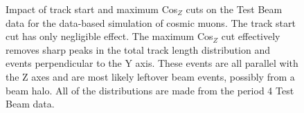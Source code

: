 \documentclass[12pt]{article}
\begin{document}
\begin{figure}[!ht]

\caption{Impact of track start and maximum Cos$_Z$ cuts on the Test Beam data for the data-based simulation of cosmic muons. The track start cut has only negligible effect. The maximum Cos$_Z$ cut effectively removes sharp peaks in the total track length distribution and events perpendicular to the Y axis. These events are all parallel with the Z axes and are most likely leftover beam events, possibly from a beam halo. All of the distributions are made from the period 4 Test Beam data.}
\label{figCosZSelectionComparison}
\end{figure}
\end{document}

